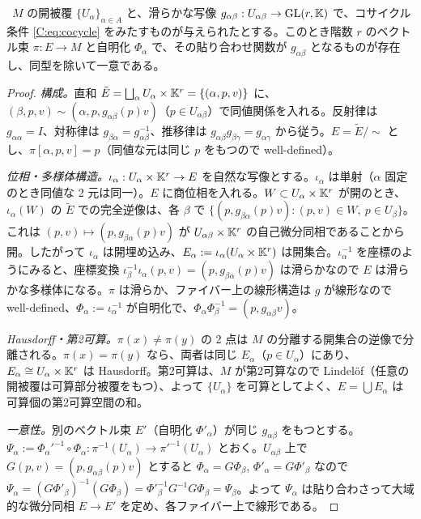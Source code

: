 \begin{thm}[貼り合わせ定理]\label{C:thm:glue}\tP\
$M$ の開被覆 $\{U_\alpha\}_{\alpha\in A}$ と、滑らかな写像 $g_{\alpha\beta}:U_{\alpha\beta}\to\mathrm{GL}(r,\mathbb K)$ で、コサイクル条件 \eqref{C:eq:cocycle} をみたすものが与えられたとする。このとき階数 $r$ のベクトル束 $\pi:E\to M$ と自明化 $\Phi_\alpha$ で、その貼り合わせ関数が $g_{\alpha\beta}$ となるものが存在し、同型を除いて一意である。
\end{thm}
\begin{proof}
\emph{構成。}直和 $\tilde E=\bigsqcup_\alpha U_\alpha\times\mathbb K^r=\{(\alpha,p,v)\}$ に、$(\beta,p,v)\sim(\alpha,p,g_{\alpha\beta}(p)v)$（$p\in U_{\alpha\beta}$）で同値関係を入れる。反射律は $g_{\alpha\alpha}=I$、対称律は $g_{\beta\alpha}=g_{\alpha\beta}^{-1}$、推移律は $g_{\alpha\beta}g_{\beta\gamma}=g_{\alpha\gamma}$ から従う。$E=\tilde E/\!\sim$ とし、$\pi[\alpha,p,v]=p$（同値な元は同じ $p$ をもつので well-defined）。

\emph{位相・多様体構造。}$\iota_\alpha:U_\alpha\times\mathbb K^r\to E$ を自然な写像とする。$\iota_\alpha$ は単射（$\alpha$ 固定のとき同値な 2 元は同一）。$E$ に商位相を入れる。$W\subset U_\alpha\times\mathbb K^r$ が開のとき、$\iota_\alpha(W)$ の $\tilde E$ での完全逆像は、各 $\beta$ で $\{(p,g_{\beta\alpha}(p)v):(p,v)\in W,\ p\in U_\beta\}$。これは $(p,v)\mapsto(p,g_{\beta\alpha}(p)v)$ が $U_{\alpha\beta}\times\mathbb K^r$ の自己微分同相であることから開。したがって $\iota_\alpha$ は開埋め込み、$E_\alpha:=\iota_\alpha(U_\alpha\times\mathbb K^r)$ は開集合。$\iota_\alpha^{-1}$ を座標のようにみると、座標変換 $\iota_\beta^{-1}\iota_\alpha(p,v)=(p,g_{\beta\alpha}(p)v)$ は滑らかなので $E$ は滑らかな多様体になる。$\pi$ は滑らか、ファイバー上の線形構造は $g$ が線形なので well-defined、$\Phi_\alpha:=\iota_\alpha^{-1}$ が自明化で、$\Phi_\alpha\Phi_\beta^{-1}=(p,g_{\alpha\beta}v)$。

\emph{Hausdorff・第2可算。}$\pi(x)\ne\pi(y)$ の 2 点は $M$ の分離する開集合の逆像で分離される。$\pi(x)=\pi(y)$ なら、両者は同じ $E_\alpha$（$p\in U_\alpha$）にあり、$E_\alpha\cong U_\alpha\times\mathbb K^r$ は Hausdorff。第2可算は、$M$ が第2可算なので Lindelöf（任意の開被覆は可算部分被覆をもつ）、よって $\{U_\alpha\}$ を可算としてよく、$E=\bigcup E_\alpha$ は可算個の第2可算空間の和。

\emph{一意性。}別のベクトル束 $E'$（自明化 $\Phi'_\alpha$）が同じ $g_{\alpha\beta}$ をもつとする。$\Psi_\alpha:=\Phi_\alpha'^{-1}\circ\Phi_\alpha:\pi^{-1}(U_\alpha)\to\pi'^{-1}(U_\alpha)$ とおく。$U_{\alpha\beta}$ 上で $G(p,v)=(p,g_{\alpha\beta}(p)v)$ とすると $\Phi_\alpha=G\Phi_\beta$, $\Phi'_\alpha=G\Phi'_\beta$ なので $\Psi_\alpha=(G\Phi'_\beta)^{-1}(G\Phi_\beta)=\Phi'^{-1}_\beta G^{-1}G\Phi_\beta=\Psi_\beta$。よって $\Psi_\alpha$ は貼り合わさって大域的な微分同相 $E\to E'$ を定め、各ファイバー上で線形である。
\end{proof}

